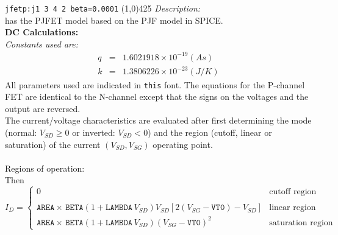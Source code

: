 \documentclass{article}
\begin{document}
\texttt{jfetp:j1\ 3\ 4\ 2\ beta=0.0001}
\newline
\linethickness{0.5mm} \line(1,0){425}
\newline
\textit{Description:}\\
\FDA has the PJFET model based on the PJF model in SPICE. \\
\newpage
\noindent\textbf{DC Calculations:} \\
\textit{Constants used are:} \\
\begin{eqnarray}
q & = & 1.6021918 \times 10^{-19} (As) \\
k & = & 1.3806226 \times 10^{-23} (J/K)
\end{eqnarray}
All parameters used are indicated in \texttt{this} font. The
equations for the P-channel FET are identical to the N-channel
except that the signs on the voltages and the output are reversed.
\\

\noindent The current/voltage characteristics are evaluated after
first determining the mode (normal: $V_{SD} \ge 0$ or inverted:
$V_{SD} < 0$) and the region (cutoff, linear or saturation) of the
current $(V_{SD}, V_{SG})$ operating point.\\

\\

Regions of operation:
\newline
{}\\
Then
\begin{equation}
I_{D} = \left\{ \begin{array}{ll}
      0  & \mbox{cutoff region} \\ \\
      \texttt{AREA} \times\, \texttt{BETA} \left(1 + \texttt{LAMBDA} \, V_{SD}\right)V_{SD}
      \left[2\left(V_{SG}- \texttt{VT0}\right)-V_{SD}\right]
         &\mbox{linear region}\\
      \texttt{AREA} \times \, \texttt{BETA} \left(1 + \texttt{LAMBDA} \, V_{SD}\right)
      \left(V_{SG}- \texttt{VT0}\right)^2
         &\mbox{saturation region} \end{array} \right. %
\end{equation}\\
\end{document}
